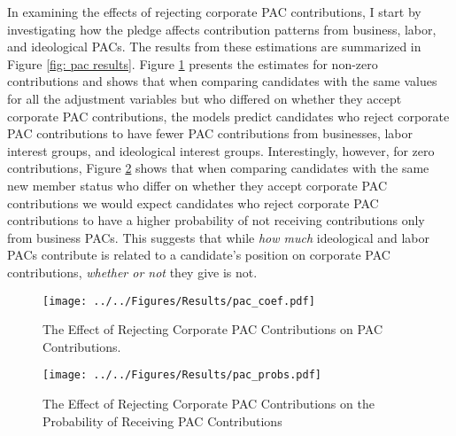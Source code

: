 \documentclass[12pt]{article}
\begin{document}
In examining the effects of rejecting corporate PAC contributions, I start by investigating how the pledge affects contribution patterns from business, labor, and ideological PACs. The results from these estimations are summarized in Figure \ref{fig: pac results}. Figure \ref{fig: pac coefs} presents the estimates for non-zero contributions and shows that when comparing candidates with the same values for all the adjustment variables but who differed on whether they accept corporate PAC contributions, the models predict candidates who reject corporate PAC contributions to have fewer PAC contributions from businesses, labor interest groups, and ideological interest groups. Interestingly, however, for zero contributions, Figure \ref{fig: pac probs} shows that when comparing candidates with the same new member status who differ on whether they accept corporate PAC contributions we would expect candidates who reject corporate PAC contributions to have a higher probability of not receiving contributions only from business PACs. This suggests that while \emph{how much} ideological and labor PACs contribute is related to a candidate's position on corporate PAC contributions, \emph{whether or not} they give is not. 

\begin{figure*}[!htb]
    \centering
    \begin{subfigure}[b]{0.65\textwidth}
        \centering
        \texttt{[image: ../../Figures/Results/pac\_coef.pdf]}
        \caption{The Effect of Rejecting Corporate PAC Contributions on PAC Contributions.}
        \label{fig: pac coefs}
    \end{subfigure}
    
    \begin{subfigure}[b]{0.65\textwidth}
        \centering
        \texttt{[image: ../../Figures/Results/pac\_probs.pdf]}
        \caption{The Effect of Rejecting Corporate PAC Contributions on the Probability of Receiving PAC Contributions}
        \label{fig: pac probs}
    \end{subfigure}
    \caption{\textbf{The Effect of Rejecting Corporate PAC Contributions on PAC Contributions and the Probability of Receiving Money from PACs.} These figures present the posterior distributions estimated for a candidate that pledges to reject corporate PAC contributions. The dot shows the median coefficient estimate and the intervals show the 50\% and 89\% highest density intervals. Figure \ref{fig: pac coefs} shows that candidates who differ by whether they pledge to reject corporate PAC contributions are expected to have fewer contributions from all types of PACs. Figure \ref{fig: pac probs} shows that candidates who reject corporate PAC contributions are expected to  have a higher probability of not receiving contributions from business PACs than candidates who accept corporate PAC contributions. See Table \ref{tbl: pac results} for the formal estimates.}
    \label{fig: pac results}
\end{figure*}
\end{document}
